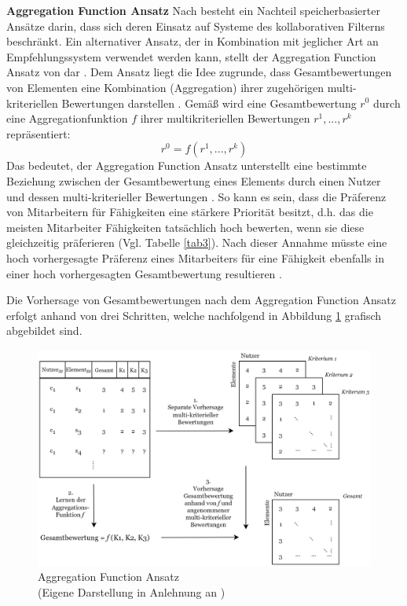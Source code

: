 \textbf{Aggregation Function Ansatz}
Nach \textcite[S. 861]{adomavicius:4:inbook} besteht ein Nachteil speicherbasierter Ansätze darin, dass sich deren Einsatz auf Systeme des kollaborativen Filterns beschränkt.
Ein alternativer Ansatz, der in Kombination mit jeglicher Art an Empfehlungssystem verwendet werden kann, stellt der Aggregation Function Ansatz von \textcite[S. 52ff.]{adomavicius:inproceedings:2} dar \cite[S. 861]{adomavicius:4:inbook}.
Dem Ansatz liegt die Idee zugrunde, dass Gesamtbewertungen von Elementen eine Kombination (Aggregation) ihrer zugehörigen multi-kriteriellen Bewertungen darstellen \cite[S. 861]{adomavicius:4:inbook}.
Gemäß \textcite[S. 52]{adomavicius:inproceedings:2} wird eine Gesamtbewertung $r^{0}$ durch eine Aggregationfunktion $f$ ihrer multikriteriellen Bewertungen $r^{1}, ..., r^{k}$ repräsentiert:
\begin{equation}\label{eq22}
    r^{0} = f(r^{1}, ..., r^{k})
\end{equation}
Das bedeutet, der Aggregation Function Ansatz unterstellt eine bestimmte Beziehung zwischen der Gesamtbewertung eines Elements durch einen Nutzer und dessen multi-kriterieller Bewertungen \cite[S. 52]{adomavicius:inproceedings:2}.
So kann es sein, dass die Präferenz von Mitarbeitern für Fähigkeiten eine stärkere Priorität besitzt, d.h. das die meisten Mitarbeiter Fähigkeiten tatsächlich hoch bewerten, wenn sie diese gleichzeitig präferieren (Vgl. Tabelle \ref{tab3}).
Nach dieser Annahme müsste eine hoch vorhergesagte Präferenz eines Mitarbeiters für eine Fähigkeit ebenfalls in einer hoch vorhergesagten Gesamtbewertung resultieren \cite[S. 52]{adomavicius:inproceedings:2}.

Die Vorhersage von Gesamtbewertungen nach dem Aggregation Function Ansatz erfolgt anhand von drei Schritten, welche nachfolgend in Abbildung \ref{fig:optimierung:loesungen:abb1} grafisch abgebildet sind.

\begin{figure}[H]
    \centering
	\includegraphics[width=1.0\textwidth]{gfx/a-f-ansatz.png}
	\caption[Aggregation Function Ansatz]{Aggregation Function Ansatz\\
    (Eigene Darstellung in Anlehnung an \cite[S. 862]{adomavicius:4:inbook})}
	\label{fig:optimierung:loesungen:abb1}
\end{figure}

